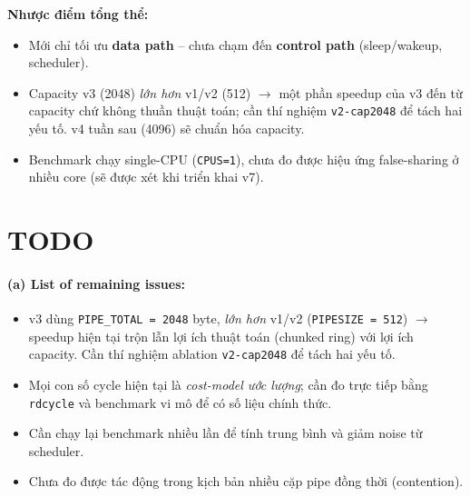 \documentclass[11pt,a4paper]{article}
\begin{document}
\textbf{Nhược điểm tổng thể:}
\begin{itemize}
  \item Mới chỉ tối ưu \textbf{data path} -- chưa chạm đến \textbf{control path} (sleep/wakeup, scheduler).
  \item Capacity v3 (2048) \emph{lớn hơn} v1/v2 (512) $\rightarrow$ một phần speedup của v3 đến từ capacity chứ không thuần thuật toán; cần thí nghiệm \texttt{v2-cap2048} để tách hai yếu tố. v4 tuần sau (4096) sẽ chuẩn hóa capacity.
  \item Benchmark chạy single-CPU (\texttt{CPUS=1}), chưa đo được hiệu ứng false-sharing ở nhiều core (sẽ được xét khi triển khai v7).
\end{itemize}

\section{TODO}

\paragraph{(a) List of remaining issues:}
\begin{itemize}
  \item v3 dùng \texttt{PIPE\_TOTAL = 2048} byte, \emph{lớn hơn} v1/v2 (\texttt{PIPESIZE = 512}) $\rightarrow$ speedup hiện tại trộn lẫn lợi ích thuật toán (chunked ring) với lợi ích capacity. Cần thí nghiệm ablation \texttt{v2-cap2048} để tách hai yếu tố.
  \item Mọi con số cycle hiện tại là \emph{cost-model ước lượng}; cần đo trực tiếp bằng \texttt{rdcycle} và benchmark vi mô để có số liệu chính thức.
  \item Cần chạy lại benchmark nhiều lần để tính trung bình và giảm noise từ scheduler.
  \item Chưa đo được tác động trong kịch bản nhiều cặp pipe đồng thời (contention).
\end{itemize}
\end{document}
